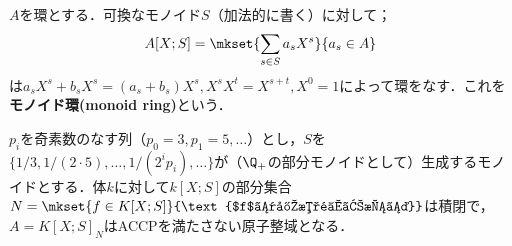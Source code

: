 \begin{defi}[モノイド環]
	$A$を環とする．可換なモノイド$S$（加法的に書く）に対して；
	\[A[X;S]=\mkset{\sum_{s\in S}a_sX^s}{a_s\in A}\]
	は$a_sX^s+b_sX^s=(a_s+b_s)X^s, X^sX^t=X^{s+t}, X^0=1$によって環をなす．これを\textbf{モノイド環(monoid ring)}という．
\end{defi} 

\begin{surex}[原子整域だがACCPを満たさない例]\label{ex:ACCPの成り立たない原子整域}
	$p_i$を奇素数のなす列（$p_0=3,p_1=5,\dots$）とし，$S$を$\{1/3,1/(2\cdot 5),\dots,1/(2^ip_i),\dots\}$が（$\Q_+$の部分モノイドとして）生成するモノイドとする．体$k$に対して$k[X;S]$の部分集合$N=\mkset{f\in K[X;S]}{\text{$f$は定数項を持つ}}$は積閉で，$A=K[X;S]_N$はACCPを満たさない原子整域となる．
\end{surex}

